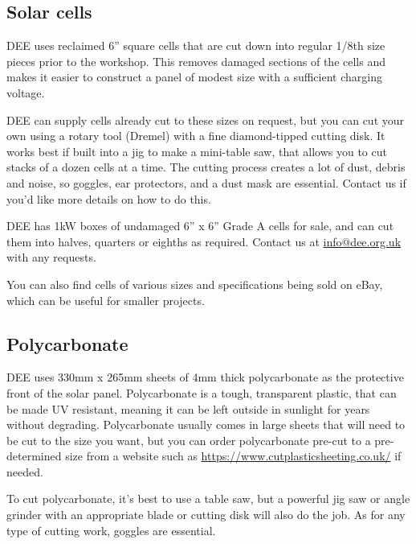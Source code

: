 \documentclass{article}
\theoremstyle{definition}
\theoremstyle{definition}
\theoremstyle{remark}
\begin{document}
  \subsection{Solar cells} %
  \label{sub:solar_cells}

    DEE uses reclaimed 6” square cells that are cut down into regular 1/8th size pieces prior to the workshop. This removes damaged sections of the cells and makes it easier to construct a panel of modest size with a sufficient charging voltage. 

    DEE can supply cells already cut to these sizes on request, but you can cut your own using a rotary tool (Dremel) with a fine diamond-tipped cutting disk. It works best if built into a jig to make a mini-table saw, that allows you to cut stacks of a dozen cells at a time. The cutting process creates a lot of dust, debris and noise, so goggles, ear protectors, and a dust mask are essential. Contact us if you'd like more details on how to do this.

    DEE has 1kW boxes of undamaged 6” x 6” Grade A cells for sale, and can cut them into halves, quarters or eighths as required. Contact us at \href{mailto:info@dee.org.uk}{info@dee.org.uk} with any requests.

    You can also find cells of various sizes and specifications being sold on eBay, which can be useful for smaller projects.
  

  \subsection{Polycarbonate} %
  \label{sub:polycarbonate}

    DEE uses 330mm x 265mm sheets of 4mm thick polycarbonate as the protective front of the solar panel. Polycarbonate is a tough, transparent plastic, that can be made UV resistant, meaning it can be left outside in sunlight for years without degrading. Polycarbonate usually comes in large sheets that will need to be cut to the size you want, but you can order polycarbonate pre-cut to a pre-determined size from a website such as \href{https://www.cutplasticsheeting.co.uk/clear-acrylic-sheeting/clear-polycarbonate-sheet}{https://www.cutplasticsheeting.co.uk/} if needed.

    To cut polycarbonate, it's best to use a table saw, but a powerful jig saw or angle grinder with an appropriate blade or cutting disk will also do the job. As for any type of cutting work, goggles are essential.
\end{document}
